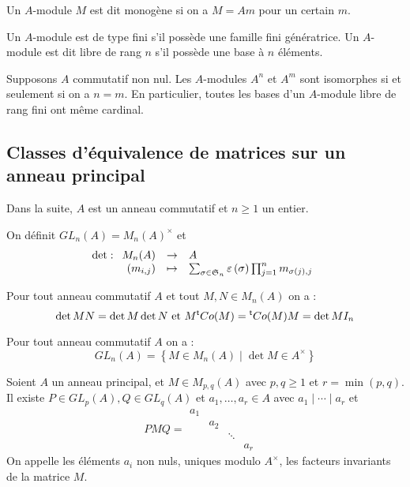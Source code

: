 \documentclass{cours}
\begin{document}
\begin{definition}
    Un $A$-module $M$ est dit monogène si on a $M = Am$ pour un certain $m$.
\end{definition}

\begin{definition}
    Un $A$-module est de type fini s'il possède une famille fini génératrice. Un $A$-module est dit libre de rang $n$ s'il possède une base à $n$ éléments.
\end{definition}

\begin{theorem}
    Supposons $A$ commutatif non nul. Les $A$-modules $A^{n}$ et $A^{m}$ sont isomorphes si et seulement si on a $n = m$. En particulier, toutes les bases d'un $A$-module libre de rang fini ont même cardinal.
\end{theorem}


\subsection{Classes d'équivalence de matrices sur un anneau principal}
Dans la suite, $A$ est un anneau commutatif et $n \geq 1$ un entier.

\begin{definition}
    On définit $GL_{n}(A) = M_{n}(A)^{\times}$ et
    \[
        \det : \begin{array}[t]{rcl} M_{n}(A) & \to & A \\ \left(m_{i,j}\right) & \mapsto & \sum_{\sigma \in \mathfrak{S}_{n}}\varepsilon\left(\sigma\right)\prod_{j = 1}^{n}m_{\sigma(j), j} \end{array}
    \]
\end{definition}

\begin{lemma}
    Pour tout anneau commutatif $A$ et tout $M, N \in M_{n}(A)$ on a :
    \[
        \det MN = \det M \det N \text{ et } M{^{\mathsf{t}}}Co(M) = {^{\mathsf{t}}}Co(M)M = \det M I_{n}
    \]
\end{lemma}

\begin{proposition}
    Pour tout anneau commutatif $A$ on a :
    \[
        GL_{n}(A) = \left\{M \in M_{n}(A) \mid \det M \in A^{\times}\right\}
    \]
\end{proposition}

\begin{theorem}
    Soient $A$ un anneau principal, et $M \in M_{p, q}(A)$ avec $p,q \geq 1$ et $r = \min({p, q})$. Il existe $P \in GL_{p}(A), Q \in GL_{q}(A)$ et $a_{1}, \ldots, a_{r} \in A$ avec $a_{1}\mid \cdots \mid a_{r}$ et
    \[
        PMQ = \begin{matrix}
            a_{1} &       &        &       & \\
                  & a_{2} &        &       & \\
                  &       & \ddots &       & \\
                  &       &        & a_{r} &
        \end{matrix}
    \]
    On appelle les éléments $a_{i}$ non nuls, uniques modulo $A^{\times}$, les facteurs invariants de la matrice $M$.
\end{theorem}
\end{document}

